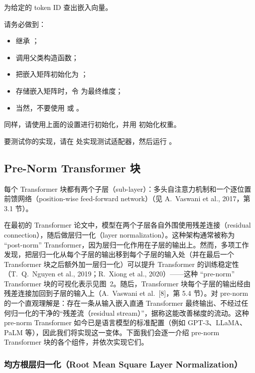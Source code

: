 \quad 为给定的 token ID 查出嵌入向量。

请务必做到：
\begin{itemize}
  \item 继承 ；
  \item 调用父类构造函数；
  \item 把嵌入矩阵初始化为 ；
  \item 存储嵌入矩阵时，令  为最终维度；
  \item 当然，不要使用  或 。
\end{itemize}

同样，请使用上面的设置进行初始化，并用  初始化权重。

要测试你的实现，请在  处实现测试适配器，然后运行 。

\subsection{Pre-Norm Transformer 块}

每个 Transformer 块都有两个子层（sub-layer）：多头自注意力机制和一个逐位置前馈网络（position-wise feed-forward network）（见 A.~Vaswani et al., 2017，第 3.1 节）。

在最初的 Transformer 论文中，模型在两个子层各自外围使用残差连接（residual connection），随后做层归一化（layer normalization）。这种架构通常被称为 ``post-norm'' Transformer，因为层归一化作用在子层的输出上。然而，多项工作发现，把层归一化从每个子层的输出移到每个子层的输入处（并在最后一个 Transformer 块之后额外加一层归一化）可以提升 Transformer 的训练稳定性（T.~Q.~Nguyen et al., 2019；R.~Xiong et al., 2020）——这种 ``pre-norm'' Transformer 块的可视化表示见图~2。随后，Transformer 块每个子层的输出经由残差连接加回到子层的输入上（A.~Vaswani et al.~[8]，第 5.4 节）。对 pre-norm 的一个直观理解是：存在一条从输入嵌入直通 Transformer 最终输出、不经过任何归一化的干净的``残差流（residual stream）''，据称这能改善梯度的流动。这种 pre-norm Transformer 如今已是语言模型的标准配置（例如 GPT-3、LLaMA、PaLM 等），因此我们将实现这一变体。下面我们会逐一介绍 pre-norm Transformer 块的各个组件，并依次实现它们。

\subsubsection{均方根层归一化（Root Mean Square Layer Normalization）}

